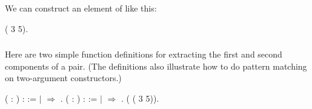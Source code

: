 \documentclass[12pt]{report}
\begin{document}
 We can construct an element of  like this: \begin{coqdoccode}
\coqdocemptyline
\coqdocnoindent
{} ( 3 5).\coqdoceol
\coqdocemptyline
\end{coqdoccode}
\subsubsection{ }



 Here are two simple function definitions for extracting the
    first and second components of a pair.  (The definitions also
    illustrate how to do pattern matching on two-argument
    constructors.) \begin{coqdoccode}
\coqdocemptyline
\coqdocnoindent
{}  ( : ) :  := \coqdoceol
\coqdocindent{1.00em}
  \coqdoceol
\coqdocindent{1.00em}
\ensuremath{|}    \ensuremath{\Rightarrow} \coqdoceol
\coqdocindent{1.00em}
.\coqdoceol
\coqdocnoindent
{}  ( : ) :  := \coqdoceol
\coqdocindent{1.00em}
  \coqdoceol
\coqdocindent{1.00em}
\ensuremath{|}    \ensuremath{\Rightarrow} \coqdoceol
\coqdocindent{1.00em}
.\coqdoceol
\coqdocemptyline
\coqdocnoindent
{}   ( ( 3 5)).\coqdoceol
\coqdocemptyline
\end{coqdoccode}
\subsubsection{ }
\end{document}
